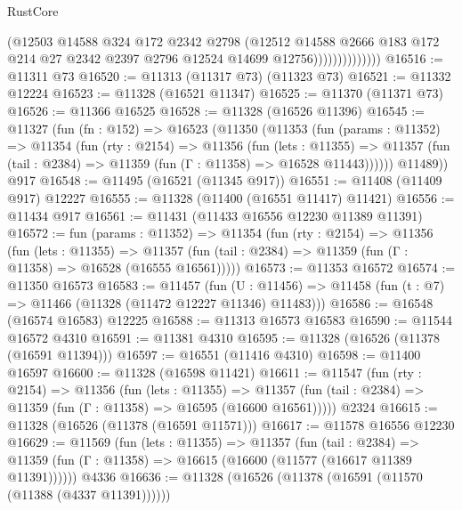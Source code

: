 \begin{lexlean}{RustCore}
\begin{coremodule}
                            (@12503
                              @14588
                              @324
                              @172
                              @2342
                              @2798
                              (@12512
                                @14588
                                @2666
                                @183
                                @172
                                @214
                                @27
                                @2342
                                @2397
                                @2796
                                @12524
                                @14699
                                @12756))))))))))))))
@16516 := @11311 @73
@16520 := @11313 (@11317 @73) (@11323 @73)
@16521 := @11332 @12224
@16523 := @11328 (@16521 @11347)
@16525 := @11370 (@11371 @73)
@16526 := @11366 @16525
@16528 := @11328 (@16526 @11396)
@16545 := @11327
    (fun (fn : @152) =>
    @16523
      (@11350
        (@11353
          (fun (params : @11352) =>
          @11354
            (fun (rty : @2154) =>
            @11356
              (fun (lets : @11355) =>
              @11357 (fun (tail : @2384) => @11359 (fun (Γ : @11358) => @16528 @11443))))))
        @11489))
    @917
@16548 := @11495 (@16521 (@11345 @917))
@16551 := @11408 (@11409 @917) @12227
@16555 := @11328 (@11400 (@16551 @11417) @11421)
@16556 := @11434 @917
@16561 := @11431 (@11433 @16556 @12230 @11389 @11391)
@16572 := fun (params : @11352) =>
  @11354
    (fun (rty : @2154) =>
    @11356
      (fun (lets : @11355) =>
      @11357 (fun (tail : @2384) => @11359 (fun (Γ : @11358) => @16528 (@16555 @16561)))))
@16573 := @11353 @16572
@16574 := @11350 @16573
@16583 := @11457
    (fun (U : @11456) => @11458 (fun (t : @7) => @11466 (@11328 (@11472 @12227 @11346) @11483)))
@16586 := @16548 (@16574 @16583) @12225
@16588 := @11313 @16573 @16583
@16590 := @11544 @16572 @4310
@16591 := @11381 @4310
@16595 := @11328 (@16526 (@11378 (@16591 @11394)))
@16597 := @16551 (@11416 @4310)
@16598 := @11400 @16597
@16600 := @11328 (@16598 @11421)
@16611 := @11547
    (fun (rty : @2154) =>
    @11356
      (fun (lets : @11355) =>
      @11357 (fun (tail : @2384) => @11359 (fun (Γ : @11358) => @16595 (@16600 @16561)))))
    @2324
@16615 := @11328 (@16526 (@11378 (@16591 @11571)))
@16617 := @11578 @16556 @12230
@16629 := @11569
    (fun (lets : @11355) =>
    @11357
      (fun (tail : @2384) =>
      @11359 (fun (Γ : @11358) => @16615 (@16600 (@11577 (@16617 @11389 @11391))))))
    @4336
@16636 := @11328 (@16526 (@11378 (@16591 (@11570 (@11388 (@4337 @11391))))))

\end{coremodule}
\end{lexlean}
